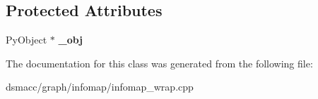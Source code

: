 \subsection*{Protected Attributes}
\begin{DoxyCompactItemize}
\item 
\mbox{\label{classswig_1_1SwigPtr__PyObject_ae617c5726496db423cd19688e3264618}} 
Py\+Object $\ast$ {\bfseries \+\_\+obj}
\end{DoxyCompactItemize}


The documentation for this class was generated from the following file\+:\begin{DoxyCompactItemize}
\item 
dsmacc/graph/infomap/infomap\+\_\+wrap.\+cpp\end{DoxyCompactItemize}
